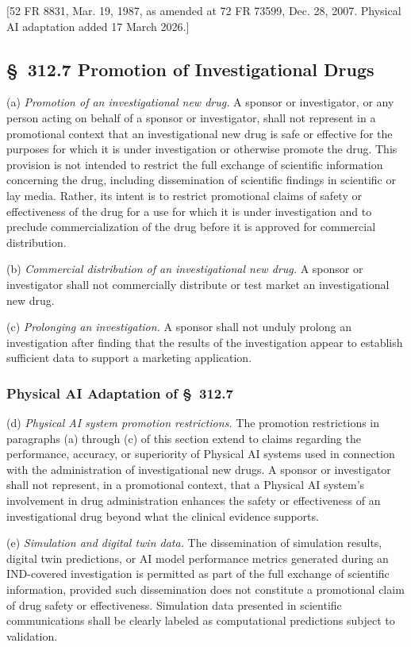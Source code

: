 \documentclass[11pt]{article}
\begin{document}
[52 FR 8831, Mar. 19, 1987, as amended at 72 FR 73599, Dec. 28, 2007. Physical AI adaptation added 17 March 2026.]

\subsection{\S~312.7 Promotion of Investigational Drugs}

(a) \textit{Promotion of an investigational new drug.} A sponsor or investigator, or any person acting on behalf of a sponsor or investigator, shall not represent in a promotional context that an investigational new drug is safe or effective for the purposes for which it is under investigation or otherwise promote the drug. This provision is not intended to restrict the full exchange of scientific information concerning the drug, including dissemination of scientific findings in scientific or lay media. Rather, its intent is to restrict promotional claims of safety or effectiveness of the drug for a use for which it is under investigation and to preclude commercialization of the drug before it is approved for commercial distribution.

(b) \textit{Commercial distribution of an investigational new drug.} A sponsor or investigator shall not commercially distribute or test market an investigational new drug.

(c) \textit{Prolonging an investigation.} A sponsor shall not unduly prolong an investigation after finding that the results of the investigation appear to establish sufficient data to support a marketing application.

\subsubsection{Physical AI Adaptation of \S~312.7}

(d) \textit{Physical AI system promotion restrictions.} The promotion restrictions in paragraphs (a) through (c) of this section extend to claims regarding the performance, accuracy, or superiority of Physical AI systems used in connection with the administration of investigational new drugs. A sponsor or investigator shall not represent, in a promotional context, that a Physical AI system's involvement in drug administration enhances the safety or effectiveness of an investigational drug beyond what the clinical evidence supports.

(e) \textit{Simulation and digital twin data.} The dissemination of simulation results, digital twin predictions, or AI model performance metrics generated during an IND-covered investigation is permitted as part of the full exchange of scientific information, provided such dissemination does not constitute a promotional claim of drug safety or effectiveness. Simulation data presented in scientific communications shall be clearly labeled as computational predictions subject to validation.
\end{document}
